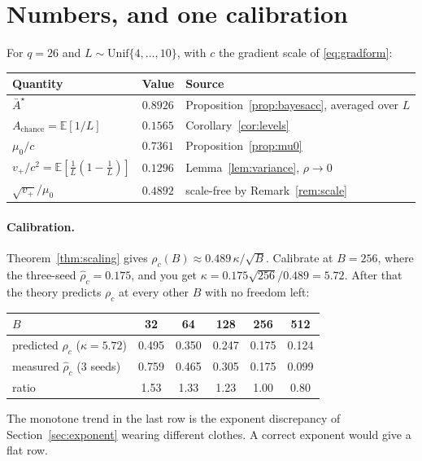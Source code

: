 \documentclass{article}
\theoremstyle{plain}
\theoremstyle{definition}
\theoremstyle{remark}
\newcommand{\E}{\mathbb{E}}
\newcommand{\1}{\mathbf{1}}
\begin{document}
\section{Numbers, and one calibration}
\label{app:numbers}

For $q = 26$ and $L\sim\mathrm{Unif}\{4,\dots,10\}$, with $c$ the gradient scale
of \eqref{eq:gradform}:
\begin{center}
\begin{tabular}{lll}
\toprule
Quantity & Value & Source \\
\midrule
$\bar A^\star$ & $0.8926$ & Proposition~\ref{prop:bayesacc}, averaged over $L$ \\
$A_{\mathrm{chance}} = \E[1/L]$ & $0.1565$ & Corollary~\ref{cor:levels} \\
$\mu_0/c$ & $0.7361$ & Proposition~\ref{prop:mu0} \\
$v_+/c^2 = \E[\tfrac1L(1-\tfrac1L)]$ & $0.1296$ & Lemma~\ref{lem:variance}, $\rho\to0$ \\
$\sqrt{v_+}/\mu_0$ & $0.4892$ & scale-free by Remark~\ref{rem:scale} \\
\bottomrule
\end{tabular}
\end{center}

\paragraph{Calibration.}
Theorem~\ref{thm:scaling} gives $\rho_c(B)\approx0.489\,\kappa/\sqrt B$. Calibrate
at $B=256$, where the three-seed $\hat\rho_c = 0.175$, and you get
$\kappa = 0.175\sqrt{256}/0.489 = 5.72$. After that the theory predicts $\rho_c$
at every other $B$ with no freedom left:
\begin{center}
\begin{tabular}{lccccc}
\toprule
$B$ & 32 & 64 & 128 & 256 & 512 \\
\midrule
predicted $\rho_c$ ($\kappa = 5.72$) & 0.495 & 0.350 & 0.247 & 0.175 & 0.124 \\
measured $\hat\rho_c$ (3 seeds) & 0.759 & 0.465 & 0.305 & 0.175 & 0.099 \\
ratio & 1.53 & 1.33 & 1.23 & 1.00 & 0.80 \\
\bottomrule
\end{tabular}
\end{center}
The monotone trend in the last row is the exponent discrepancy of
Section~\ref{sec:exponent} wearing different clothes. A correct exponent would
give a flat row.
\end{document}
